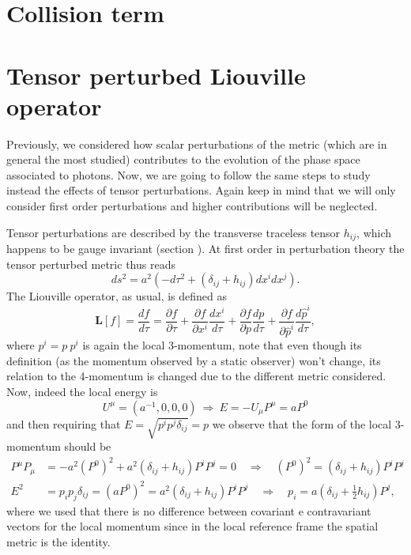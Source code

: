 \section{Collision term}   \label{app:collisionTerm}
\section{Tensor perturbed Liouville operator}\label{app:tensorPerturbedLiouvilleOperator}
Previously, we considered how scalar perturbations of the metric (which are in general the most studied) contributes to the evolution of the phase space associated to photons. Now, we are going to follow the same steps to study instead the effects of tensor perturbations. Again keep in mind that we will only consider first order perturbations and higher contributions will be neglected.

Tensor perturbations are described by the transverse traceless tensor $h_{ij}$, which happens to be gauge invariant (section ). At first order in perturbation theory the tensor perturbed metric thus reads 
$$ds^2=a^2(-d\tau^2+(\delta_{ij}+h_{ij})dx^idx^j).$$
The Liouville operator, as usual, is defined as
$$\hat{\mathbf{L}}[f]=\frac{df}{d\tau}=\frac{\partial f}{\partial \tau}+\frac{\partial f}{\partial x^i}\frac{d x^i}{d\tau}+\frac{\partial f}{\partial p}\frac{d p}{d\tau}+\frac{\partial f}{\partial \hat p^i}\frac{d \hat p^i}{d\tau},$$
where $p^i=p\ p^i$ is again the local 3-momentum, note that even though its definition (as the momentum observed by a static observer) won't change, its relation to the 4-momentum is changed due to the different metric considered. Now, indeed the local energy is
$$U^\mu=(a^{-1},0,0,0)\ \Rightarrow\ E=-U_\mu P^\mu= aP^0$$
and then requiring that $E=\sqrt{p^ip^j\delta_{ij}}=p$ we observe that the form of the local 3-momentum should be
\begin{align*}
    P^\mu P_\mu&=-a^2(P^0)^2+a^2(\delta_{ij}+h_{ij})P^iP^j=0\quad\Rightarrow \quad(P^0)^2=(\delta_{ij}+h_{ij})P^iP^j\\E^2&=p_ip_j\delta_{ij}=(aP^0)^2=a^2(\delta_{ij}+h_{ij})P^iP^j\quad\Rightarrow \quad p_i=a(\delta_{ij}+\frac{1}{2}h_{ij})P^j,
\end{align*} 
where we used that there is no difference between covariant e contravariant vectors for the local momentum since in the local reference frame the spatial metric is the identity.

